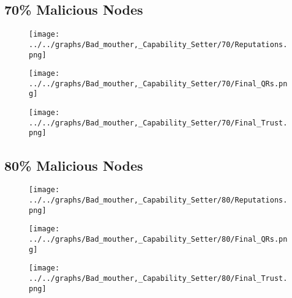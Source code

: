 \begin{minipage}[t]{0.49\columnwidth}
\subsection*{70\% Malicious Nodes}
    \begin{figure}[H]
        \centering
        \texttt{[image: ../../graphs/Bad\_mouther,\_Capability\_Setter/70/Reputations.png]}
    \end{figure}
    \begin{figure}[H]
        \centering
        \texttt{[image: ../../graphs/Bad\_mouther,\_Capability\_Setter/70/Final\_QRs.png]}
    \end{figure}
\end{minipage}
\begin{minipage}[t]{0.49\columnwidth}
    \begin{figure}[H]
        \centering
        \texttt{[image: ../../graphs/Bad\_mouther,\_Capability\_Setter/70/Final\_Trust.png]}
    \end{figure}
\end{minipage}

\begin{minipage}[t]{0.49\columnwidth}
\subsection*{80\% Malicious Nodes}
    \begin{figure}[H]
        \centering
        \texttt{[image: ../../graphs/Bad\_mouther,\_Capability\_Setter/80/Reputations.png]}
    \end{figure}
    \begin{figure}[H]
        \centering
        \texttt{[image: ../../graphs/Bad\_mouther,\_Capability\_Setter/80/Final\_QRs.png]}
    \end{figure}
\end{minipage}
\begin{minipage}[t]{0.49\columnwidth}
    \begin{figure}[H]
        \centering
        \texttt{[image: ../../graphs/Bad\_mouther,\_Capability\_Setter/80/Final\_Trust.png]}
    \end{figure}
\end{minipage}

